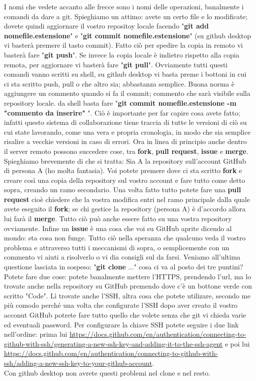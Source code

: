 \documentclass[10pt,a4paper]{article}
\begin{document}
I nomi che vedete accanto alle frecce sono i nomi delle operazioni, banalmente i comandi da dare a git. Spieghiamo un attimo: avete un certo file e lo modificate; dovete quindi aggiornare il vostro repositoy locale facendo "\textbf{git add nomefile.estensione}" e "\textbf{git commit nomefile.estensione}" (su github desktop vi basterà premere il tasto commit). Fatto ciò per spedire la copia in remoto vi basterà fare "\textbf{git push}". Se invece la copia locale è indietro rispetto alla copia remota, per aggiornare vi basterà fare "\textbf{git pull}". Ovviamente tutti questi comandi vanno scritti su shell, su github desktop vi basta preme i bottoni in cui ci sta scritto push, pull o che altro sia; abbastanza semplice. Buona norma è aggiungere un commento quando si fa il commit; commento che sarà visibile sulla repository locale. da shell basta fare "\textbf{git commit nomefile.estensione -m "commento da inserire"} ". Ciò è importante per far capire cosa avete fatto; infatti questo sistema di collaborazione tiene traccia di tutte le versioni di ciò su cui state lavorando, come una vera e propria cronologia, in modo che sia semplice risalire a vecchie versioni in caso di errori. Ora in linea di principio anche dentro il server remoto possono succedere cose, tra \textbf{fork}, \textbf{pull request}, \textbf{issue} e \textbf{merge}. Spieghiamo brevemente di che si tratta: Sia A la repository sull'account GitHub di persona A (ho molta fantasia). Voi potete premere dove ci sta scritto \textbf{fork} e creare così una copia della repository sul vostro account e fare tutto come detto sopra, creando un ramo secondario. Una volta fatto tutto potete fare una \textbf{pull request} cioè chiedere che la vostra modifica entri nel ramo principale dalla quale avete eseguito il \textbf{fork}; se chi gestice la repository (persona A) è d'accordo allora lui farà il \textbf{merge}. Tutto ciò può anche essere fatto su una vostra repository ovviamente. Infine un \textbf{issue} è una cosa che voi su GitHub aprite dicendo al mondo: sta cosa non funge. Tutto ciò nella speranza che qualcuno veda il vostro problema e attraverso tutti i meccanismi di sopra, o semplicemente con un commento vi aiuti a risolverlo o vi dia consigli sul da farsi.
Veniamo all'ultima questione lasciata in sospeso: "\textbf{git clone} ..." cosa ci va al posto dei tre puntini? Potete fare due cose: potete banalmente mettere l'HTTPS, prendendo l'url, ma lo trovate anche nella repository su GitHub premendo dove c'è un bottone verde con scritto "Code". Lì trovate anche l'SSH, altra cosa che potete utilizare, secondo me più comodo perché una volta che configurate l'SSH dopo aver creato il vostro acconut GitHub potrete fare tutto quello che volete senza che git vi chieda varie ed eventuali password. Per configurare la chiave SSH potete seguire i due link nell'ordine: prima lui \url{https://docs.github.com/en/authentication/connecting-to-github-with-ssh/generating-a-new-ssh-key-and-adding-it-to-the-ssh-agent} e poi lui \url{https://docs.github.com/en/authentication/connecting-to-github-with-ssh/adding-a-new-ssh-key-to-your-github-account}. \\
Con github desktop non avrete questi problemi nel clone e nel resto.
\end{document}
